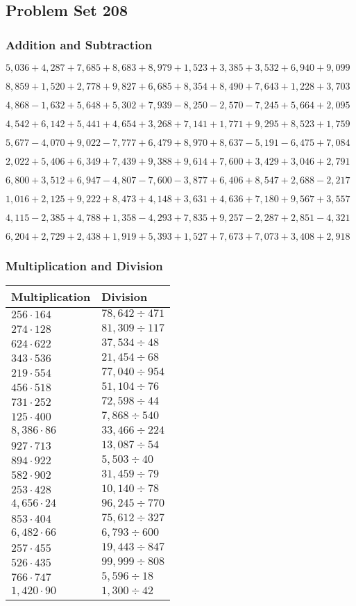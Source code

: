 \hypertarget{problem-set-208}{%
\subsection{Problem Set 208}\label{problem-set-208}}

\hypertarget{addition-and-subtraction}{%
\subsubsection{Addition and
Subtraction}\label{addition-and-subtraction}}

\(5,036+4,287+7,685+8,683+8,979+1,523+3,385+3,532+6,940+9,099\)

\(8,859+1,520+2,778+9,827+6,685+8,354+8,490+7,643+1,228+3,703\)

\(4,868-1,632+5,648+5,302+7,939-8,250-2,570-7,245+5,664+2,095\)

\(4,542+6,142+5,441+4,654+3,268+7,141+1,771+9,295+8,523+1,759\)

\(5,677-4,070+9,022-7,777+6,479+8,970+8,637-5,191-6,475+7,084\)

\(2,022+5,406+6,349+7,439+9,388+9,614+7,600+3,429+3,046+2,791\)

\(6,800+3,512+6,947-4,807-7,600-3,877+6,406+8,547+2,688-2,217\)

\(1,016+2,125+9,222+8,473+4,148+3,631+4,636+7,180+9,567+3,557\)

\(4,115-2,385+4,788+1,358-4,293+7,835+9,257-2,287+2,851-4,321\)

\(6,204+2,729+2,438+1,919+5,393+1,527+7,673+7,073+3,408+2,918\)

\hypertarget{multiplication-and-division}{%
\subsubsection{Multiplication and
Division}\label{multiplication-and-division}}

\begin{longtable}[]{@{}ll@{}}
\toprule
Multiplication & Division\tabularnewline
\midrule
\endhead
\(256\cdot164\) & \(78,642÷471\)\tabularnewline
\(274\cdot128\) & \(81,309÷117\)\tabularnewline
\(624\cdot622\) & \(37,534÷48\)\tabularnewline
\(343\cdot536\) & \(21,454÷68\)\tabularnewline
\(219\cdot554\) & \(77,040÷954\)\tabularnewline
\(456\cdot518\) & \(51,104÷76\)\tabularnewline
\(731\cdot252\) & \(72,598÷44\)\tabularnewline
\(125\cdot400\) & \(7,868÷540\)\tabularnewline
\(8,386\cdot86\) & \(33,466÷224\)\tabularnewline
\(927\cdot713\) & \(13,087÷54\)\tabularnewline
\(894\cdot922\) & \(5,503÷40\)\tabularnewline
\(582\cdot902\) & \(31,459÷79\)\tabularnewline
\(253\cdot428\) & \(10,140÷78\)\tabularnewline
\(4,656\cdot24\) & \(96,245÷770\)\tabularnewline
\(853\cdot404\) & \(75,612÷327\)\tabularnewline
\(6,482\cdot66\) & \(6,793÷600\)\tabularnewline
\(257\cdot455\) & \(19,443÷847\)\tabularnewline
\(526\cdot435\) & \(99,999÷808\)\tabularnewline
\(766\cdot747\) & \(5,596÷18\)\tabularnewline
\(1,420\cdot90\) & \(1,300÷42\)\tabularnewline
\bottomrule
\end{longtable}
